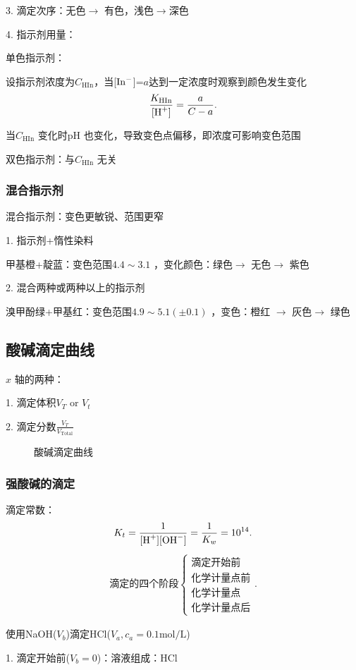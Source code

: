 3. 滴定次序：无色$\to $ 有色，浅色$ \to $深色

4. 指示剂用量：
\begin{eg}
    单色指示剂：

    设指示剂浓度为$C_{\text{HIn}}$，当[$\ce{In-}$]=$a$达到一定浓度时观察到颜色发生变化
    \[
        \frac{K_{\text{HIn}}}{[\ce{H+}]}=\frac{a}{C-a}
    .\] 

    当$C_{\text{HIn}}$ 变化时pH 也变化，导致变色点偏移，即浓度可影响变色范围
\end{eg}
双色指示剂：与$C_{\text{HIn}}$ 无关
\subsubsection{混合指示剂}%
\label{subsub:混合指示剂}
\begin{notation}
    混合指示剂：变色更敏锐、范围更窄
\end{notation}
1. 指示剂+惰性染料
\begin{eg}
    甲基橙+靛蓝：变色范围$4.4\sim 3.1$ ，变化颜色：绿色$\to $ 无色$\to $ 紫色
\end{eg}
2. 混合两种或两种以上的指示剂
\begin{eg}
    溴甲酚绿+甲基红：变色范围$4.9\sim 5.1\left( \pm 0.1 \right) $ ，变色：橙红 $\to $ 灰色$\to $ 绿色
\end{eg}
\subsection{酸碱滴定曲线}%
\label{sub:酸碱滴定曲线}
\begin{notation}
    $x$ 轴的两种：

    1. 滴定体积$V_T\text{ or }V_t$ 

    2. 滴定分数${\frac{V_T}{V_{\text{Total}}}}$
\end{notation}
\begin{figure}[ht]
    \centering
    \caption{酸碱滴定曲线}
    \label{fig:酸碱滴定曲线}
\end{figure}
\subsubsection{强酸碱的滴定}%
\label{subsub:强酸碱的滴定}
滴定常数：\[
    K_t=\frac{1}{[\ce{H+}][\ce{OH-}]}=\frac{1}{K_w}=10^{14}
.\] 
\begin{align*}
    \text{滴定的四个阶段}
    \begin{cases}
        \text{滴定开始前}\\
        \text{化学计量点前}\\
        \text{化学计量点}\\
        \text{化学计量点后}
    \end{cases}
.\end{align*}
\begin{eg}
    使用NaOH($V_b$)滴定HCl($V_a,c_a=0.1\text{mol/L}$)
\end{eg}
1. 滴定开始前($V_b=0$)：溶液组成：HCl

